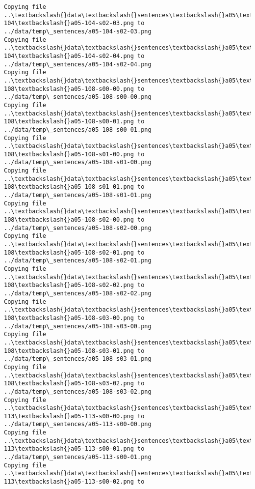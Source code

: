 \documentclass[11pt]{article}
\begin{document}
\begin{Verbatim}[commandchars=\\\{\}]
Copying file ..\textbackslash{}data\textbackslash{}sentences\textbackslash{}a05\textbackslash{}a05-104\textbackslash{}a05-104-s02-03.png to
../data/temp\_sentences/a05-104-s02-03.png
Copying file ..\textbackslash{}data\textbackslash{}sentences\textbackslash{}a05\textbackslash{}a05-104\textbackslash{}a05-104-s02-04.png to
../data/temp\_sentences/a05-104-s02-04.png
Copying file ..\textbackslash{}data\textbackslash{}sentences\textbackslash{}a05\textbackslash{}a05-108\textbackslash{}a05-108-s00-00.png to
../data/temp\_sentences/a05-108-s00-00.png
Copying file ..\textbackslash{}data\textbackslash{}sentences\textbackslash{}a05\textbackslash{}a05-108\textbackslash{}a05-108-s00-01.png to
../data/temp\_sentences/a05-108-s00-01.png
Copying file ..\textbackslash{}data\textbackslash{}sentences\textbackslash{}a05\textbackslash{}a05-108\textbackslash{}a05-108-s01-00.png to
../data/temp\_sentences/a05-108-s01-00.png
Copying file ..\textbackslash{}data\textbackslash{}sentences\textbackslash{}a05\textbackslash{}a05-108\textbackslash{}a05-108-s01-01.png to
../data/temp\_sentences/a05-108-s01-01.png
Copying file ..\textbackslash{}data\textbackslash{}sentences\textbackslash{}a05\textbackslash{}a05-108\textbackslash{}a05-108-s02-00.png to
../data/temp\_sentences/a05-108-s02-00.png
Copying file ..\textbackslash{}data\textbackslash{}sentences\textbackslash{}a05\textbackslash{}a05-108\textbackslash{}a05-108-s02-01.png to
../data/temp\_sentences/a05-108-s02-01.png
Copying file ..\textbackslash{}data\textbackslash{}sentences\textbackslash{}a05\textbackslash{}a05-108\textbackslash{}a05-108-s02-02.png to
../data/temp\_sentences/a05-108-s02-02.png
Copying file ..\textbackslash{}data\textbackslash{}sentences\textbackslash{}a05\textbackslash{}a05-108\textbackslash{}a05-108-s03-00.png to
../data/temp\_sentences/a05-108-s03-00.png
Copying file ..\textbackslash{}data\textbackslash{}sentences\textbackslash{}a05\textbackslash{}a05-108\textbackslash{}a05-108-s03-01.png to
../data/temp\_sentences/a05-108-s03-01.png
Copying file ..\textbackslash{}data\textbackslash{}sentences\textbackslash{}a05\textbackslash{}a05-108\textbackslash{}a05-108-s03-02.png to
../data/temp\_sentences/a05-108-s03-02.png
Copying file ..\textbackslash{}data\textbackslash{}sentences\textbackslash{}a05\textbackslash{}a05-113\textbackslash{}a05-113-s00-00.png to
../data/temp\_sentences/a05-113-s00-00.png
Copying file ..\textbackslash{}data\textbackslash{}sentences\textbackslash{}a05\textbackslash{}a05-113\textbackslash{}a05-113-s00-01.png to
../data/temp\_sentences/a05-113-s00-01.png
Copying file ..\textbackslash{}data\textbackslash{}sentences\textbackslash{}a05\textbackslash{}a05-113\textbackslash{}a05-113-s00-02.png to

\end{Verbatim}
\end{document}
